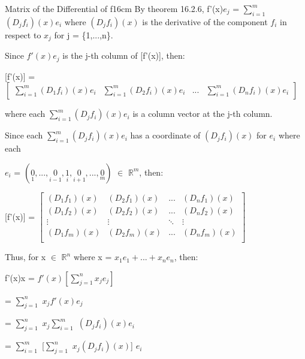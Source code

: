     \begin{definition}{Matrix of the Differential of f}{16cm}
        By {\color{red} theorem 16.2.6},
        f'(x)$e_j$ = $\sum_{i=1}^m$ $(D_jf_i)(x)e_i$
        where $(D_jf_i)(x)$ is the derivative of the
        component $f_i$ in respect to $x_j$ for j = \{1,...,n\}.

        Since $f'(x)e_j$ is the j-th column of [f'(x)], then:

        \vspace{0.1cm}

        \hspace{0.5cm}
        [f'(x)] = 
        $
        \begin{bmatrix}
            \sum_{i=1}^m (D_1f_i)(x)e_i
            & \sum_{i=1}^m (D_2f_i)(x)e_i
            & ...
            & \sum_{i=1}^m (D_nf_i)(x)e_i
        \end{bmatrix}
        $

        where each $\sum_{i=1}^m (D_jf_i)(x)e_i$ is a column vector
        at the j-th column.
        
        Since each $\sum_{i=1}^m (D_jf_i)(x)e_i$ has a coordinate
        of $(D_jf_i)(x)$ for $e_i$ where each
        
        $e_i$ =
        $(\underset{\scriptscriptstyle 1}{0},...,
                    \underset{\scriptscriptstyle i-1}{0},
                    \underset{\scriptscriptstyle i}{1},
                    \underset{\scriptscriptstyle i+1}{0},...,
                    \underset{\scriptscriptstyle m}{0})$
        $\in$ $\mathbb{R}^m$, then:

        \vspace{0.1cm}

        \hspace{0.5cm}
        [f'(x)] =
        $
        \begin{bmatrix}
            (D_1f_1)(x) & (D_2f_1)(x) & ... & (D_nf_1)(x) \\
            (D_1f_2)(x) & (D_2f_2)(x) & ... & (D_nf_2)(x) \\
            \vdots & \vdots & \ddots & \vdots \\
            (D_1f_m)(x) & (D_2f_m)(x) & ... & (D_nf_m)(x) \\
        \end{bmatrix}
        $

        Thus, for x $\in$ $\mathbb{R}^n$ where
        x = $x_1e_1 + ... + x_ne_n$, then:

        \hspace{0.5cm}
        f'(x)x
        = $f'(x)[\sum_{j=1}^n x_j e_j]$

        \hspace{1.7cm}
        = $\sum_{j=1}^n$ $x_j f'(x) e_j$

        \hspace{1.7cm}
        = $\sum_{j=1}^n$ $x_j \sum_{i=1}^m$ $(D_jf_i)(x)e_i$

        \hspace{1.7cm}
        = $\sum_{i=1}^m$ [$\sum_{j=1}^n$ $x_j (D_jf_i)(x)$] $e_i$
    \end{definition}

